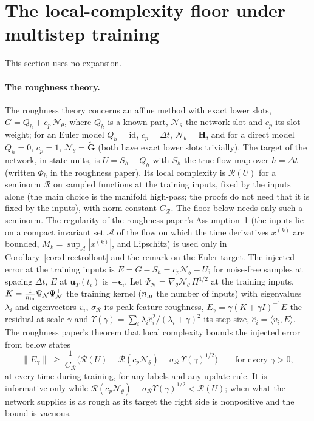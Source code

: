\documentclass[11pt]{article}
\theoremstyle{definition}
\theoremstyle{remark}
\newcommand{\uu}{\mathbf{u}}
\newcommand{\Gt}{\tilde{\mathbf{G}}}
\newcommand{\Hop}{\mathbf{H}}
\newcommand{\eps}{\bm{\epsilon}}
\newcommand{\Rgh}{\mathcal{R}}
\newcommand{\dt}{\Delta t}
\newcommand{\Nn}{\mathcal N_\theta}
\begin{document}
\section{The local-complexity floor under multistep training}\label{sec:floor}

This section uses no expansion.

\paragraph{The roughness theory.}
The roughness theory concerns an affine method with exact lower slots, $G=Q_h+c_p\,\Nn$, where $Q_h$ is a known part, $\Nn$ the network slot and $c_p$ its slot weight; for an Euler model $Q_h=\mathrm{id}$, $c_p=\dt$, $\Nn=\Hop$, and for a direct model $Q_h=0$, $c_p=1$, $\Nn=\Gt$ (both have exact lower slots trivially).
The target of the network, in state units, is $U=S_h-Q_h$ with $S_h$ the true flow map over $h=\dt$ (written $\Phi_h$ in the roughness paper).
Its local complexity is $\Rgh(U)$ for a seminorm $\Rgh$ on sampled functions at the training inputs, fixed by the inputs alone (the main choice is the manifold high-pass; the proofs do not need that it is fixed by the inputs), with norm constant $C_\Rgh$.
The floor below needs only such a seminorm. The regularity of the roughness paper's Assumption~1 (the inputs lie on a compact invariant set $\mathcal A$ of the flow on which the time derivatives $x^{(k)}$ are bounded, $M_k=\sup_{\mathcal A}|x^{(k)}|$, and Lipschitz) is used only in Corollary~\ref{cor:directrollout} and the remark on the Euler target.
The injected error at the training inputs is $E=G-S_h=c_p\Nn-U$; for noise-free samples at spacing $\dt$, $E$ at $\uu_T(t_i)$ is $-\eps_i$.
Let $\Psi_{\mathcal N}=\nabla_\theta\Nn\,\Pi^{1/2}$ at the training inputs, $K=\frac1{n_{\rm in}}\Psi_{\mathcal N}\Psi_{\mathcal N}^\top$ the training kernel ($n_{\rm in}$ the number of inputs) with eigenvalues $\lambda_i$ and eigenvectors $v_i$, $\sigma_\Rgh$ its peak feature roughness, $E_\gamma=\gamma(K+\gamma I)^{-1}E$ the residual at scale $\gamma$ and $\Upsilon(\gamma)=\sum_i\lambda_i\hat e_i^2/(\lambda_i+\gamma)^2$ its step size, $\hat e_i=\langle v_i,E\rangle$.
The roughness paper's theorem that local complexity bounds the injected error from below states
\begin{equation}\label{eq:floor}
\|E_\gamma\|\ \ge\ \frac1{C_\Rgh}\Big(\Rgh(U)-\Rgh(c_p\Nn)-\sigma_\Rgh\,\Upsilon(\gamma)^{1/2}\Big)\qquad\text{for every }\gamma>0,
\end{equation}
at every time during training, for any labels and any update rule.
It is informative only while $\Rgh(c_p\Nn)+\sigma_\Rgh\Upsilon(\gamma)^{1/2}<\Rgh(U)$; when what the network supplies is as rough as its target the right side is nonpositive and the bound is vacuous.
\end{document}
